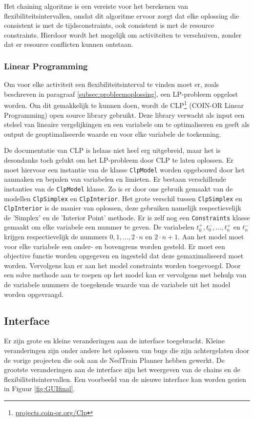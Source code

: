 Het chaining algoritme is een vereiste voor het berekenen van flexibiliteitsintervallen, omdat dit algoritme ervoor zorgt dat elke oplossing die consistent is met de tijdsconstraints, ook consistent is met de resource constraints. Hierdoor wordt het mogelijk om activiteiten te verschuiven, zonder dat er resource conflicten kunnen ontstaan.

\subsubsection{Linear Programming}
Om voor elke activiteit een flexibiliteitsinterval te vinden moet er, zoals beschreven in paragraaf \ref{subsec:probleemoplossing}, een LP-probleem opgelost worden. Om dit gemakkelijk te kunnen doen, wordt de CLP\footnote{\href{https://projects.coin-or.org/Clp}{projects.coin-or.org/Clp}} (COIN-OR Linear Programming) open source library gebruikt. Deze library verwacht als input een stelsel van lineaire vergelijkingen en een variabele om te optimaliseren en geeft als output de geoptimaliseerde waarde en voor elke variabele de toekenning.

De documentatie van CLP is helaas niet heel erg uitgebreid, maar het is desondanks toch gelukt om het LP-probleem door CLP te laten oplossen. Er moet hiervoor een instantie van de klasse \texttt{ClpModel} worden opgebouwd door het aanmaken en bepalen van variabelen en limieten. Er bestaan verschillende instanties van de \texttt{ClpModel} klasse. Zo is er door ons gebruik gemaakt van de modellen \texttt{ClpSimplex} en \texttt{ClpInterior}. Het grote verschil tussen \texttt{ClpSimplex} en \texttt{ClpInterior} is de manier van oplossen, deze gebruiken namelijk respectievelijk de 'Simplex' en de 'Interior Point' methode. Er is zelf nog een \texttt{Constraints} klasse gemaakt om elke variabele een nummer te geven. De variabelen $t^+_0, t^-_0, \ldots, t^+_n$ en $t^-_n$ krijgen respectievelijk de nummers $0, 1, \ldots, 2 \cdot n$ en $2 \cdot n + 1$. Aan het model moet voor elke variabele een onder- en bovengrens worden gesteld. Er moet een objective functie worden opgegeven en ingesteld dat deze gemaximaliseerd moet worden. Vervolgens kan er aan het model constraints worden toegevoegd. Door een solve methode aan te roepen op het model kan er vervolgens met behulp van de variabele nummers de toegekende waarde van de variabele uit het model worden opgevraagd.

\subsection{Interface}
Er zijn grote en kleine veranderingen aan de interface toegebracht. Kleine veranderingen zijn onder andere het oplossen van bugs die zijn achtergelaten door de vorige projecten die ook aan de NedTrain Planner hebben gewerkt. De grootste veranderingen aan de interface zijn het weergeven van de chains en de flexibiliteitsintervallen. Een voorbeeld van de nieuwe interface kan worden gezien in Figuur \ref{fig:GUIfinal}.

